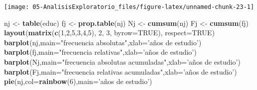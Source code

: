 \documentclass[]{book}
\newenvironment{Shaded}{\begin{snugshade}}{\end{snugshade}}
\newcommand{\DataTypeTok}[1]{\textcolor[rgb]{0.13,0.29,0.53}{#1}}
\newcommand{\DecValTok}[1]{\textcolor[rgb]{0.00,0.00,0.81}{#1}}
\newcommand{\KeywordTok}[1]{\textcolor[rgb]{0.13,0.29,0.53}{\textbf{#1}}}
\newcommand{\NormalTok}[1]{#1}
\newcommand{\OperatorTok}[1]{\textcolor[rgb]{0.81,0.36,0.00}{\textbf{#1}}}
\newcommand{\OtherTok}[1]{\textcolor[rgb]{0.56,0.35,0.01}{#1}}
\newcommand{\StringTok}[1]{\textcolor[rgb]{0.31,0.60,0.02}{#1}}
\begin{document}
\begin{Shaded}
\end{Shaded}

\begin{center}\texttt{[image: 05-AnalisisExploratorio\_files/figure-latex/unnamed-chunk-23-1]} \end{center}

\begin{Shaded}
\begin{Highlighting}[]
\NormalTok{nj <-}\StringTok{ }\KeywordTok{table}\NormalTok{(educ)}
\NormalTok{fj <-}\StringTok{ }\KeywordTok{prop.table}\NormalTok{(nj)}
\NormalTok{Nj <-}\StringTok{ }\KeywordTok{cumsum}\NormalTok{(nj)}
\NormalTok{Fj <-}\StringTok{ }\KeywordTok{cumsum}\NormalTok{(fj)}
\KeywordTok{layout}\NormalTok{(}\KeywordTok{matrix}\NormalTok{(}\KeywordTok{c}\NormalTok{(}\DecValTok{1}\NormalTok{,}\DecValTok{2}\NormalTok{,}\DecValTok{5}\NormalTok{,}\DecValTok{3}\NormalTok{,}\DecValTok{4}\NormalTok{,}\DecValTok{5}\NormalTok{), }\DecValTok{2}\NormalTok{, }\DecValTok{3}\NormalTok{, }\DataTypeTok{byrow=}\OtherTok{TRUE}\NormalTok{), }\DataTypeTok{respect=}\OtherTok{TRUE}\NormalTok{)}
\KeywordTok{barplot}\NormalTok{(nj,}\DataTypeTok{main=}\StringTok{"frecuencia absolutas"}\NormalTok{,}\DataTypeTok{xlab=}\StringTok{'años de estudio'}\NormalTok{)}
\KeywordTok{barplot}\NormalTok{(fj,}\DataTypeTok{main=}\StringTok{"frecuencia relativas"}\NormalTok{,}\DataTypeTok{xlab=}\StringTok{'años de estudio'}\NormalTok{)}
\KeywordTok{barplot}\NormalTok{(Nj,}\DataTypeTok{main=}\StringTok{"frecuencia absolutas acumuladas"}\NormalTok{,}\DataTypeTok{xlab=}\StringTok{'años de estudio'}\NormalTok{)}
\KeywordTok{barplot}\NormalTok{(Fj,}\DataTypeTok{main=}\StringTok{"frecuencia relativas acumuladas"}\NormalTok{,}\DataTypeTok{xlab=}\StringTok{'años de estudio'}\NormalTok{)}
\KeywordTok{pie}\NormalTok{(nj,}\DataTypeTok{col=}\KeywordTok{rainbow}\NormalTok{(}\DecValTok{6}\NormalTok{),}\DataTypeTok{main=}\StringTok{'años de estudio'}\NormalTok{)}
\end{Highlighting}
\end{Shaded}
\end{document}
